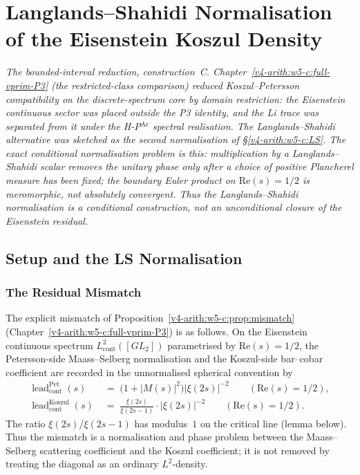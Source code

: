 \chapter{Langlands--Shahidi Normalisation of the Eisenstein Koszul Density}
\label{v4-arith:w6-c:LS-correction}

\emph{The bounded-interval reduction, construction~C. Chapter~\ref{v4-arith:w5-c:full-vprim-P3}
(the restricted-class comparison) reduced Koszul--Petersson compatibility on the
discrete-spectrum core by domain restriction: the Eisenstein
continuous sector was placed outside the P3 identity, and the Li
trace was separated from it under the H-P\(^{\mathrm{Ar}}\) spectral
realisation. The Langlands--Shahidi alternative was sketched as
the second normalisation of \S\ref{v4-arith:w5-c:LS}. The exact
conditional normalisation problem is this: multiplication by a
Langlands--Shahidi scalar removes the unitary phase only after a
choice of positive Plancherel measure has been fixed; the boundary
Euler product on \(\mathrm{Re}(s)=1/2\) is meromorphic, not absolutely
convergent. Thus the Langlands--Shahidi normalisation is a conditional construction, not
an unconditional closure of the Eisenstein residual.}

\section{Setup and the LS Normalisation}
\label{v4-arith:w6-c:LS:setup}

\subsection{The Residual Mismatch}
\label{v4-arith:w6-c:LS:residual}

The explicit mismatch of
Proposition~\ref{v4-arith:w5-c:prop:mismatch}
(Chapter~\ref{v4-arith:w5-c:full-vprim-P3})
is as follows. On the Eisenstein continuous spectrum
\(L^{2}_{\mathrm{cont}}([GL_{2}])\) parametrised by
\(\mathrm{Re}(s)=1/2\), the Petersson-side Maass--Selberg normalisation and
the Koszul-side bar--cobar coefficient are recorded in the
unnormalised spherical convention by
\begin{align}
\label{v4-arith:w6-c:eq:Pet-density}
\operatorname{lead}^{\mathrm{Pet}}_{\mathrm{cont}}(s)
&\;=\;\bigl(1+|M(s)|^{2}\bigr)|\xi(2s)|^{-2}\qquad(\mathrm{Re}(s)=1/2),\\
\label{v4-arith:w6-c:eq:Koszul-density}
\operatorname{lead}^{\mathrm{Koszul}}_{\mathrm{cont}}(s)
&\;=\;\frac{\xi(2s)}{\xi(2s-1)}\cdot|\xi(2s)|^{-2}\qquad(\mathrm{Re}(s)=1/2).
\end{align}
The ratio \(\xi(2s)/\xi(2s-1)\) has modulus~\(1\) on the critical line
(lemma below). Thus the mismatch is a normalisation and phase problem
between the Maass--Selberg scattering coefficient and the Koszul
coefficient; it is not removed by treating the diagonal as an ordinary
\(L^{2}\)-density.

